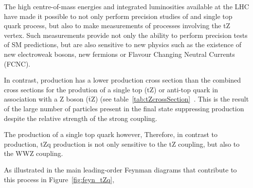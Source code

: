 The high centre-of-mass energies and integrated luminosities available at the LHC have made it possible to not only perform precision studies of \ttbar and single top quark process, but also to make measurements of processes involving the tZ vertex.
Such measurements provide not only the ability to perform precision tests of SM predictions, but are also sensitive to new physics such as the existence of new electroweak bosons, new fermions or Flavour Changing Neutral Currents (FCNC).




%
In contrast, \ttZ production has a lower production cross section than the combined cross sections for the prodution of a single top (tZ) or anti-top quark in association with a Z boson ($\overline{\text{t}}$Z) (see table~\ref{tab:tZcrossSection}~\cite{Campbell:2013yla}.
This is the result of the large number of particles present in the \ttZ final state suppressing \ttZ production despite the relative strength of the strong coupling.


The production of a single top quark however, 
Therefore, in contrast to \ttZ production, tZq production is not only sensitive to the tZ coupling, but also to the WWZ coupling.


As illustrated in the main leading-order Feynman diagrams that contribute to this process in Figure~\ref{fig:feyn_tZq},


